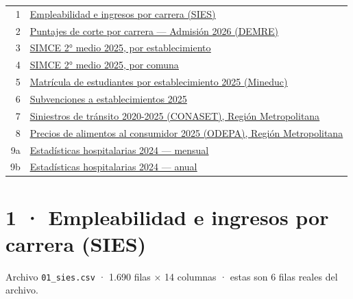 \documentclass[10pt]{article}
\begin{document}
\vspace{4pt}
\begin{guiabox}[Índice]
\begin{tabular}{@{}r l@{}}
1 & \hyperlink{base1}{\textcolor{azuloscuro}{\underline{Empleabilidad e ingresos por carrera (SIES)}}} \\
2 & \hyperlink{base2}{\textcolor{azuloscuro}{\underline{Puntajes de corte por carrera — Admisión 2026 (DEMRE)}}} \\
3 & \hyperlink{base3}{\textcolor{azuloscuro}{\underline{SIMCE 2° medio 2025, por establecimiento}}} \\
4 & \hyperlink{base4}{\textcolor{azuloscuro}{\underline{SIMCE 2° medio 2025, por comuna}}} \\
5 & \hyperlink{base5}{\textcolor{azuloscuro}{\underline{Matrícula de estudiantes por establecimiento 2025 (Mineduc)}}} \\
6 & \hyperlink{base6}{\textcolor{azuloscuro}{\underline{Subvenciones a establecimientos 2025}}} \\
7 & \hyperlink{base7}{\textcolor{azuloscuro}{\underline{Siniestros de tránsito 2020-{}2025 (CONASET), Región Metropolitana}}} \\
8 & \hyperlink{base8}{\textcolor{azuloscuro}{\underline{Precios de alimentos al consumidor 2025 (ODEPA), Región Metropolitana}}} \\
9a & \hyperlink{base9a}{\textcolor{azuloscuro}{\underline{Estadísticas hospitalarias 2024 — mensual}}} \\
9b & \hyperlink{base9b}{\textcolor{azuloscuro}{\underline{Estadísticas hospitalarias 2024 — anual}}} \\
\end{tabular}
\end{guiabox}

\clearpage
\hypertarget{base1}{}
\section{1 · Empleabilidad e ingresos por carrera (SIES)}
\small Archivo \texttt{01\_sies.csv} · 1.690 filas × 14 columnas · estas son 6 filas reales del archivo.\normalsize
\end{document}
